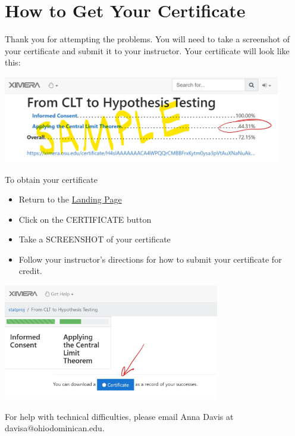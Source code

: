 \documentclass{ximera}
\begin{document}
\section{How to Get Your Certificate}
Thank you for attempting the problems.  You will need to take a screenshot of your certificate and submit it to your instructor.  Your certificate will look like this:

\begin{image}
         \includegraphics[height=1.5in]{certificate.jpg}
\end{image}

To obtain your certificate
\begin{itemize}
    \item Return to the \href{https://ximera.osu.edu/statproj/CLTtoHT}{Landing Page}
    \item Click on the CERTIFICATE button
    \item Take a SCREENSHOT of your certificate 
    \item Follow your instructor's directions for how to submit your certificate for credit.
\end{itemize}
\begin{image}
         \includegraphics[height=2in]{certificate2.jpg}
\end{image}

For help with technical difficulties, please email Anna Davis at davisa@ohiodominican.edu.
\end{document}
